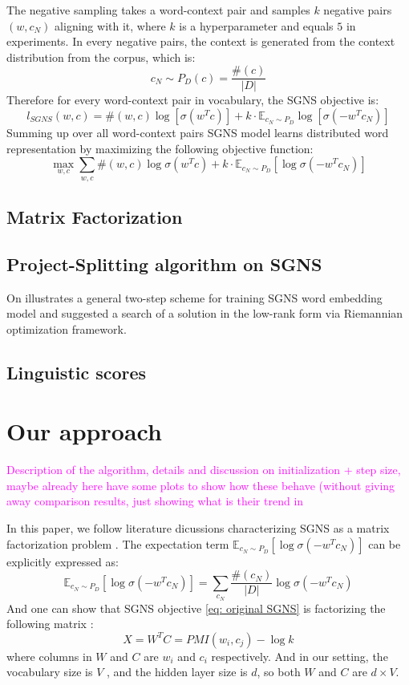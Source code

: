 \documentclass[letterpaper]{article} %
\begin{document}
The negative sampling takes a word-context pair and samples $k$ negative pairs $(w,c_N)$ aligning with it, where $k$ is a hyperparameter and equals $5$ in experiments. In every negative pairs, the context is generated from the context distribution from the corpus, which is:
\begin{equation}
	c_N\sim P_D(c)=\frac{\#(c)}{|D|}
\end{equation}
Therefore for every word-context pair in vocabulary, the SGNS objective is:
\begin{equation}
	l_{SGNS}(w,c)= \#(w,c)\log[\sigma(w^Tc)]+k\cdot\mathbb{E}_{c_N\sim P_D}\log[\sigma(-w^Tc_N)]
\end{equation}
Summing up over all word-context pairs SGNS model learns distributed word representation by maximizing the following objective function:
\begin{equation}
	\max_{w,c} \sum_{w,c}\#(w,c)\log\sigma(w^Tc)+k\cdot\mathbb{E}_{c_N\sim P_D}[\log \sigma(-w^Tc_N)] \label{eq: original SGNS}
\end{equation}
\subsection{Matrix Factorization}
\subsection{Project-Splitting algorithm on SGNS}
On \cite{fonarev2017riemannian} illustrates a general two-step scheme for training SGNS word embedding model and suggested a search of a solution in the low-rank form via Riemannian optimization framework.
\subsection{Linguistic scores}

\section{Our approach}
\textcolor{magenta}{Description of the algorithm, details and discussion on initialization + step size, maybe already here have some plots to show how these behave (without giving away comparison results, just showing what is their trend in}

In this paper, we follow literature dicussions characterizing SGNS as a matrix factorization problem \cite{levy2014neural}\cite{levy2015improving}. The expectation term $\mathbb{E}_{c_N\sim P_D}[\log \sigma(-w^Tc_N)]$ can be explicitly expressed as:
\begin{equation}
	\mathbb{E}_{c_N\sim P_D}[\log \sigma(-w^Tc_N)]=\sum_{c_N}\frac{\#(c_N)}{|D|}\log{\sigma(-w^Tc_N)}
\end{equation}
And one can show that SGNS objective \ref{eq: original SGNS} is factorizing the following matrix \cite{levy2014neural}:
\begin{equation}
	X=W^TC= PMI(w_i, c_j)-\log k \label{eq: SPPMI}
\end{equation}
where columns in $W$ and $C$ are $w_i$ and $c_i$ respectively. And in our setting, the vocabulary size is $V$ , and the hidden layer size is $d$, so both $W$ and $C$ are $d\times V$.
\end{document}
